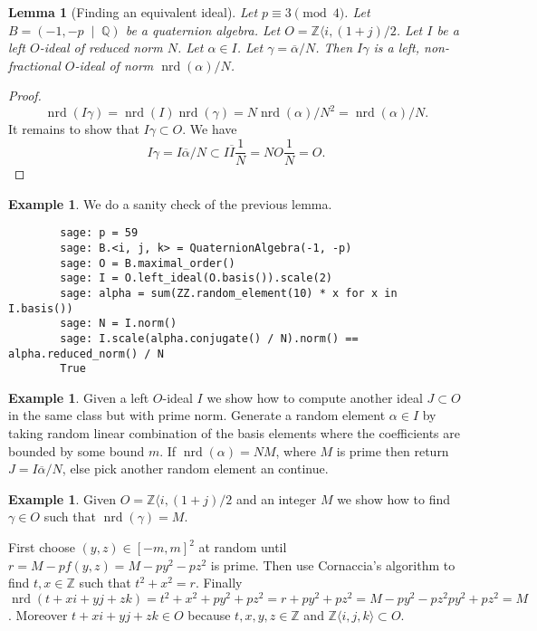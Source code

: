 \documentclass[10pt]{article}
\theoremstyle{plain}
\newtheorem{lemma}[theorem]{Lemma}
\theoremstyle{definition}
\newtheorem{example}[theorem]{Example}
\newcommand{\op}{\operatorname}
\newcommand{\Z}{\mathbb{Z}}
\newcommand{\Q}{\mathbb{Q}}
\newcommand{\nrd}{\op{nrd}}
\begin{document}
\begin{lemma}[Finding an equivalent ideal]
    Let \( p \equiv 3 \pmod{4} \).
    Let \( B =  (-1, -p \; \mid \; \Q) \) be a quaternion algebra.
    Let \( O = \Z \langle i, (1+j) / 2 \).
    Let \( I \) be a left \( O \)-ideal of reduced norm \( N \).
    Let \( \alpha \in I \).
    Let \( \gamma = \overline{\alpha} / N \).
    Then \( I \gamma \) is a left, non-fractional \( O \)-ideal of norm \( \nrd(\alpha) / N \).
\end{lemma}
\begin{proof}
    \[
        \nrd(I \gamma) = \nrd(I)\nrd(\gamma) = N \nrd(\alpha) / N^2 = \nrd(\alpha) / N.
    \]
    It remains to show that \( I\gamma \subset O \).
    We have
    \[
        I\gamma = I\overline{\alpha} / N \subset I\overline{I} \frac{1}{N} = NO \frac{1}{N} = O.
    \]
\end{proof}

\begin{example}
    We do a sanity check of the previous lemma.
    \begin{lstlisting}
        sage: p = 59
        sage: B.<i, j, k> = QuaternionAlgebra(-1, -p)
        sage: O = B.maximal_order()
        sage: I = O.left_ideal(O.basis()).scale(2)
        sage: alpha = sum(ZZ.random_element(10) * x for x in I.basis())
        sage: N = I.norm()
        sage: I.scale(alpha.conjugate() / N).norm() == alpha.reduced_norm() / N
        True
    \end{lstlisting}
\end{example}

\begin{example}
    Given a left \( O \)-ideal \( I \) we show how to compute another ideal \( J \subset O \) in the same class but with prime norm.
    Generate a random element \( \alpha \in I \) by taking random linear combination of the basis elements where the coefficients are bounded by some bound \( m \).
    If \( \nrd(\alpha) = NM \), where \( M \) is prime then return \( J = I \overline{\alpha} / N \), else pick another random element an continue.
\end{example}

\begin{example}
    Given \( O = \Z \langle i, (1+j) / 2 \) and an integer \( M \) we show how to find \( \gamma \in O \) such that \( \nrd(\gamma) = M \).

    First choose \( (y, z) \in [-m , m]^2 \) at random until \( r = M - pf(y, z) = M - py^2 - pz^2\) is prime.
    Then use Cornaccia's algorithm to find \( t, x \in \Z \) such that \(  t^2 + x^2 = r.\)
    Finally \( \nrd(t + xi + yj + zk) = t^2 + x^2 + py^2 + pz^2 = r + py^2 + pz^2 = M - py^2 - pz^2 py^2 + pz^2 = M\).
    Moreover \( t + xi + yj + zk \in O \) because \( t, x, y, z \in \Z \) and \( \Z \langle i ,j, k \rangle \subset O \).
\end{example}
\end{document}
